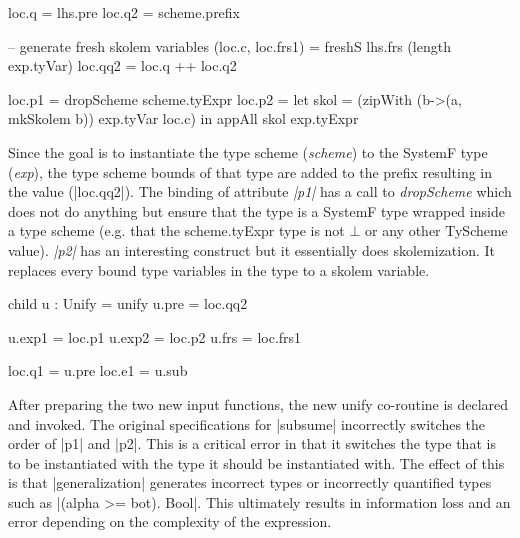 \begin{code}
loc.q   = lhs.pre
loc.q2  = scheme.prefix

-- generate fresh skolem variables
(loc.c, loc.frs1) = freshS lhs.frs (length exp.tyVar)
loc.qq2 = loc.q ++ loc.q2

loc.p1  = dropScheme scheme.tyExpr
loc.p2  =  let skol = (zipWith (\a b->(a, mkSkolem b)) exp.tyVar loc.c)
           in  appAll skol exp.tyExpr
\end{code}
Since the goal is to instantiate the type scheme (\emph{scheme}) to the SystemF type (\emph{exp}), the type scheme bounds of that type are added to the prefix resulting in the value (|loc.qq2|). 
The binding of attribute \emph{|p1|} has a call to \emph{dropScheme} which does not do anything but ensure that the type is a SystemF type wrapped inside a type scheme (e.g. that the scheme.tyExpr type is not $\bot$ or any other TyScheme value). \emph{|p2|} has an interesting construct but it essentially does skolemization. It replaces every bound type variables in the type to a skolem variable.

\begin{code}
child u : Unify = unify
u.pre  = loc.qq2

u.exp1  = loc.p1
u.exp2  = loc.p2
u.frs   = loc.frs1
        
loc.q1  = u.pre
loc.e1  = u.sub
\end{code}
After preparing the two new input functions, the new unify co-routine is declared and invoked. The original specifications for |subsume| incorrectly switches the order of |p1| and |p2|. This is a critical error in that it switches the type that is to be instantiated with the type it should be instantiated with. The effect of this is that |generalization| generates incorrect types or incorrectly quantified types such as |(alpha >= bot). Bool|.
This ultimately results in information loss and an error depending on the complexity of the expression.

